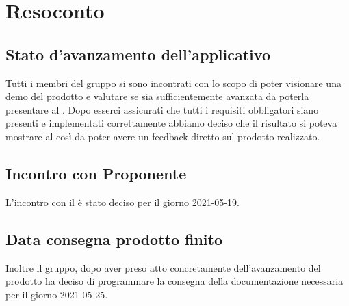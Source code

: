 \section{Resoconto}

\subsection{Stato d'avanzamento dell'applicativo}
Tutti i membri del gruppo si sono incontrati con lo scopo di poter visionare una demo del prodotto e valutare se sia sufficientemente avanzata da poterla presentare al \proponProg. 
Dopo esserci assicurati che tutti i requisiti obbligatori siano presenti e implementati correttamente abbiamo deciso che il risultato si poteva mostrare al \proponProg{} così da poter avere un feedback diretto sul prodotto realizzato.\\
\subsection{Incontro con Proponente}
L'incontro con il \proponProg{}  è stato deciso per il giorno 2021-05-19.\\
\subsection{Data consegna prodotto finito}
Inoltre il gruppo, dopo aver preso atto concretamente dell'avanzamento del prodotto ha deciso di programmare la consegna della documentazione necessaria per il giorno 2021-05-25.